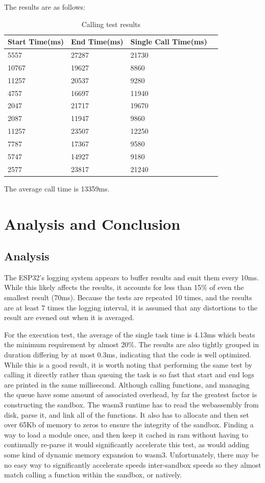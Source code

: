 \documentclass{article}
\begin{document}
\begin{enumerate}
The results are as follows:
\begin{table}[H]
\begin{tabular}{|l|l|l|l|}
\hline
Start Time(ms)		&End Time(ms)				&Single Call Time(ms)\\ \hline
5557	 & 27287	 & 21730\\ \hline
10767	 & 19627	 & 8860\\ \hline
11257	 & 20537	 & 9280\\ \hline
4757	 & 16697	 & 11940\\ \hline
2047	 & 21717	 & 19670\\ \hline
2087	 & 11947	 & 9860\\ \hline
11257	 & 23507	 & 12250\\ \hline
7787	 & 17367	 & 9580\\ \hline
5747	 & 14927	 & 9180\\ \hline
2577	 & 23817	 & 21240\\ \hline
\end{tabular}
\caption{Calling test results}
\end{table}

The average call time is 13359ms.

\end{enumerate}


\section{Analysis and Conclusion}
\subsection{Analysis}
The ESP32's logging system appears to buffer results and emit them every 10ms. While this likely affects the results, it accounts for less than 15\% of even the smallest result (70ms). Because the tests are repeated 10 times, and the results are at least 7 times the logging interval, it is assumed that any distortions to the result are evened out when it is averaged.

For the execution test, the average of the single task time is 4.13ms which beats the minimum requirement by almost 20\%. The results are also tightly grouped in duration differing by at most 0.3ms, indicating that the code is well optimized. While this is a good result, it is worth noting that performing the same test by calling it directly rather than queuing the task is so fast that start and end logs are printed in the same millisecond. Although calling functions, and managing the queue have some amount of associated overhead, by far the greatest factor is constructing the sandbox. The wasm3 runtime has to read the webassembly from disk, parse it, and link all of the functions. It also has to allocate and then set over 65Kb of memory to zeros to ensure the integrity of the sandbox. Finding a way to load a module once, and then keep it cached in ram without having to continually re-parse it would significantly accelerate this test, as would adding some kind of dynamic memory expansion to wasm3. Unfortunately, there may be no easy way to significantly accelerate speeds inter-sandbox speeds so they almost match calling a function within the sandbox, or natively.
\end{document}
